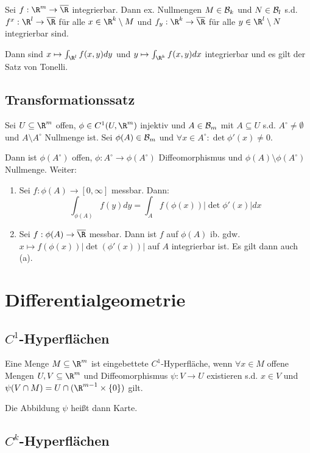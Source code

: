 Sei $f : \R^m \to \overline\R$ integrierbar. Dann ex. Nullmengen $M \in \mathcal{B}_k$ und $N \in \mathcal{B}_l$ s.d. $f^x : \R^l \to \overline\R$ für alle $x \in \R^k \setminus M$ und $f_y : \R^k \to \overline\R$ für alle $y \in \R^l \setminus N$ integrierbar sind.

Dann sind $x \mapsto \int_{\R^l} f(x,y) dy$ und $y \mapsto \int_{\R^k} f(x,y) dx$ integrierbar und es gilt der Satz von Tonelli.

\subsection*{Transformationssatz}

Sei $U \subseteq \R^m$ offen, $\phi \in C^1(U,\R^m)$ injektiv und $A \in \mathcal{B}_m$ mit $A \subseteq U$ s.d. $A^\circ \neq \emptyset$ und $A \setminus A^\circ$ Nullmenge ist. Sei $\phi(A) \in \mathcal{B}_m$ und $\forall x \in A^\circ : \det \phi'(x) \neq 0$.

Dann ist $\phi(A^\circ)$ offen, $\phi : A^\circ \to \phi(A^\circ)$ Diffeomorphismus und $\phi(A) \setminus \phi(A^\circ)$ Nullmenge. Weiter:

\begin{enumerate}[label=(\alph*)]
	\item Sei $f: \phi(A) \to [0,\infty]$ messbar. Dann: \vspace{-2mm} $$\int_{\phi(A)} f(y) dy = \int_A f(\phi(x))|\det \phi'(x)| dx$$
	\item Sei $f : \phi(A) \to \overline\R$ messbar. Dann ist $f$ auf $\phi(A)$ ib. gdw. $x \mapsto f(\phi(x))|\det(\phi'(x))|$ auf $A$ integrierbar ist. Es gilt dann auch (a).
\end{enumerate}

\section*{Differentialgeometrie}

\subsection*{$C^1$-Hyperflächen}

Eine Menge $M \subseteq \R^m$ ist eingebettete $C^1$-Hyperfläche, wenn $\forall x \in M$ offene Mengen $U, V \subseteq \R^m$ und Diffeomorphismus $\psi : V \to U$ existieren s.d. $x \in V$ und $\psi(V \cap M) = U \cap (\R^{m-1} \times \{0\})$ gilt.

Die Abbildung $\psi$ heißt dann Karte.

\subsection*{$C^k$-Hyperflächen}


